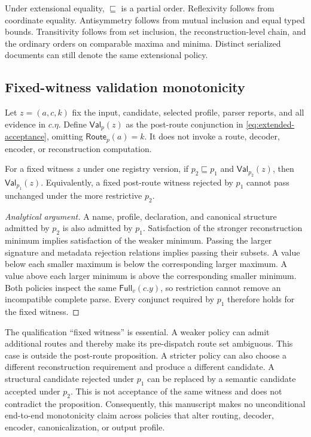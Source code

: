 Under extensional equality, $\sqsubseteq$ is a partial order. Reflexivity follows
from coordinate equality. Antisymmetry follows from mutual inclusion and equal
typed bounds. Transitivity follows from set inclusion, the reconstruction-level
chain, and the ordinary orders on comparable maxima and minima. Distinct
serialized documents can still denote the same extensional policy.

\subsection{Fixed-witness validation monotonicity}

Let $z=(a,c,k)$ fix the input, candidate, selected profile, parser reports, and
all evidence in $c.\eta$. Define $\mathsf{Val}_p(z)$ as the post-route
conjunction in \cref{eq:extended-acceptance}, omitting
$\mathsf{Route}_p(a)=k$. It does not invoke a route, decoder, encoder, or
reconstruction computation.

\begin{proposition}
\label{prop:validation-monotonicity}
For a fixed witness $z$ under one registry version, if
$p_2\sqsubseteq p_1$ and $\mathsf{Val}_{p_2}(z)$, then
$\mathsf{Val}_{p_1}(z)$. Equivalently, a fixed post-route witness rejected by
$p_1$ cannot pass unchanged under the more restrictive $p_2$.
\end{proposition}

\begin{proof}[Analytical argument]
A name, profile, declaration, and canonical structure admitted by $p_2$ is also
admitted by $p_1$. Satisfaction of the stronger reconstruction minimum implies
satisfaction of the weaker minimum. Passing the larger signature and metadata
rejection relations implies passing their subsets. A value below each smaller
maximum is below the corresponding larger maximum. A value above each larger
minimum is above the corresponding smaller minimum. Both policies inspect the
same $\mathsf{Full}_v(c.y)$, so restriction cannot remove an incompatible
complete parse. Every conjunct required by $p_1$ therefore holds for the fixed
witness.
\end{proof}

The qualification ``fixed witness'' is essential. A weaker policy can admit
additional routes and thereby make its pre-dispatch route set ambiguous. This
case is outside the post-route proposition. A stricter policy can also choose
a different reconstruction requirement and produce a different candidate. A
structural candidate rejected under $p_1$ can be replaced by a semantic
candidate accepted under $p_2$. This is not acceptance of the same witness and
does not contradict the proposition. Consequently, this manuscript makes no
unconditional end-to-end monotonicity claim across policies that alter routing,
decoder, encoder, canonicalization, or output profile.

